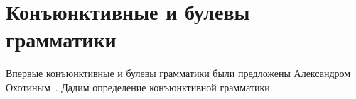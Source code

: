 \setchapterpreamble[u]{\margintoc}
\chapter{Конъюнктивные и булевы грамматики}
\label{chpt:ConjunctiveBoolean}

Впервые конъюнктивные и булевы грамматики были предложены Александром Охотиным~\cite{DBLP:journals/jalc/Okhotin01,Okhotin:2003:BG:1758089.1758123}. Дадим определение конъюнктивной грамматики.



